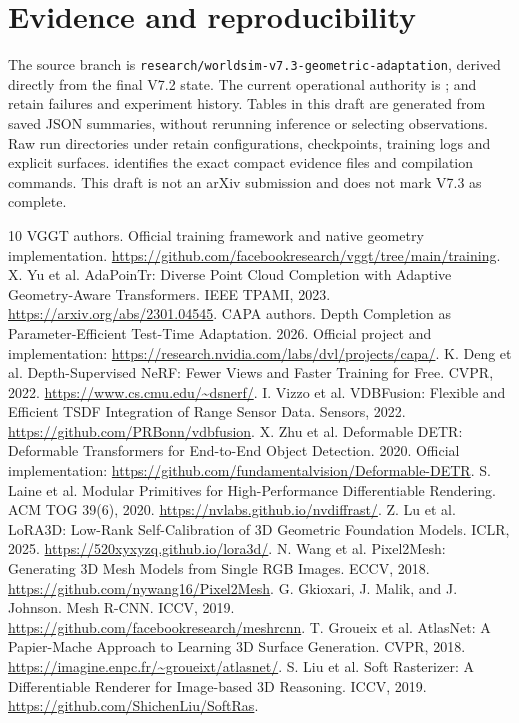\documentclass[10pt,a4paper]{article}
\begin{document}
\section*{Evidence and reproducibility}
The source branch is \texttt{research/worldsim-v7.3-geometric-adaptation},
derived directly from the final V7.2 state. The current operational authority
is ;  and
 retain failures and experiment history. Tables in
this draft are generated from saved JSON summaries, without rerunning
inference or selecting observations. Raw run directories under
 retain configurations, checkpoints,
training logs and explicit surfaces.  identifies
the exact compact evidence files and compilation commands. This draft is
not an arXiv submission and does not mark V7.3 as complete.

\begin{thebibliography}{10}
 VGGT authors. Official training framework and native geometry
implementation. \url{https://github.com/facebookresearch/vggt/tree/main/training}.
 X. Yu et al. AdaPoinTr: Diverse Point Cloud Completion with
Adaptive Geometry-Aware Transformers. IEEE TPAMI, 2023.
\url{https://arxiv.org/abs/2301.04545}.
 CAPA authors. Depth Completion as Parameter-Efficient Test-Time
Adaptation. 2026. Official project and implementation:
\url{https://research.nvidia.com/labs/dvl/projects/capa/}.
 K. Deng et al. Depth-Supervised NeRF: Fewer Views and Faster
Training for Free. CVPR, 2022. \url{https://www.cs.cmu.edu/~dsnerf/}.
 I. Vizzo et al. VDBFusion: Flexible and Efficient TSDF
Integration of Range Sensor Data. Sensors, 2022.
\url{https://github.com/PRBonn/vdbfusion}.
 X. Zhu et al. Deformable DETR: Deformable Transformers
for End-to-End Object Detection. 2020. Official implementation:
\url{https://github.com/fundamentalvision/Deformable-DETR}.
 S. Laine et al. Modular Primitives for High-Performance
Differentiable Rendering. ACM TOG 39(6), 2020.
\url{https://nvlabs.github.io/nvdiffrast/}.
 Z. Lu et al. LoRA3D: Low-Rank Self-Calibration of 3D
Geometric Foundation Models. ICLR, 2025.
\url{https://520xyxyzq.github.io/lora3d/}.
 N. Wang et al. Pixel2Mesh: Generating 3D Mesh Models
from Single RGB Images. ECCV, 2018. \url{https://github.com/nywang16/Pixel2Mesh}.
 G. Gkioxari, J. Malik, and J. Johnson. Mesh R-CNN.
ICCV, 2019. \url{https://github.com/facebookresearch/meshrcnn}.
 T. Groueix et al. AtlasNet: A Papier-Mache Approach to
Learning 3D Surface Generation. CVPR, 2018.
\url{https://imagine.enpc.fr/~groueixt/atlasnet/}.
 S. Liu et al. Soft Rasterizer: A Differentiable Renderer for
Image-based 3D Reasoning. ICCV, 2019.
\url{https://github.com/ShichenLiu/SoftRas}.
\end{thebibliography}
\end{document}
